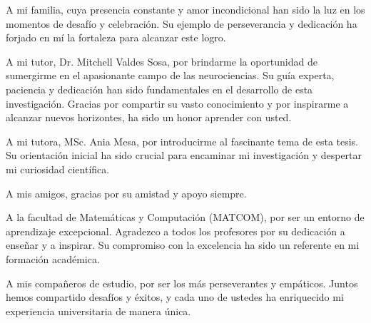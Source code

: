 \begin{acknowledgements}
        
    A mi familia, cuya presencia constante y amor incondicional han sido la luz en los momentos de desafío y celebración. Su ejemplo de perseverancia y dedicación ha forjado en mí la fortaleza para alcanzar este logro. 
       
    A mi tutor, Dr. Mitchell Valdes Sosa, por brindarme la oportunidad de sumergirme en el apasionante campo de las neurociencias. Su guía experta, paciencia y dedicación han sido fundamentales en el desarrollo de esta investigaci\'on. Gracias por compartir su vasto conocimiento y por inspirarme a alcanzar nuevos horizontes, ha sido un honor aprender con usted.
    
    A mi tutora, MSc. Ania Mesa, por introducirme al fascinante tema de esta tesis. Su orientación inicial ha sido crucial para encaminar mi investigación y despertar mi curiosidad científica.
    
     A mis amigos, gracias por su amistad y apoyo siempre.
    
    A la facultad de Matemáticas y Computación (MATCOM), por ser un entorno de aprendizaje excepcional. Agradezco a todos los profesores por su dedicación a enseñar y a inspirar. Su compromiso con la excelencia ha sido un referente en mi formación académica.
    
    A mis compañeros de estudio, por ser los más perseverantes y empáticos. Juntos hemos compartido desafíos y éxitos, y cada uno de ustedes ha enriquecido mi experiencia universitaria de manera única.
    
    
\end{acknowledgements}